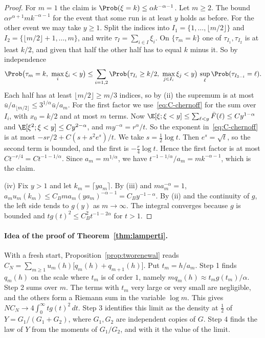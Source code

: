 \begin{proof}
For $m=1$ the claim is $\Prob(\xi=k)\le\alpha k^{-\alpha-1}$. Let $m\ge2$. The bound
$\alpha r^{\alpha+1}mk^{-\alpha-1}$ for the event that some run is at least $y$ holds as
before. For the other event we may take $y\ge1$. Split the indices into
$I_1=\{1,\dots,\lfloor m/2\rfloor\}$ and $I_2=\{\lfloor m/2\rfloor+1,\dots,m\}$, and
write $\tau_I=\sum_{i\in I}\xi_i$. On $\{\tau_m=k\}$ one of $\tau_{I_1},\tau_{I_2}$ is at
least $k/2$, and given that half the other half has to equal $k$ minus it. So by
independence
\[
\Prob\bigl(\tau_m=k,\ \max_i\xi_i<y\bigr)\le\sum_{i=1,2}
\Prob\bigl(\tau_{I_i}\ge k/2,\ \max_{j\in I_i}\xi_j<y\bigr)\,\sup_\ell\Prob(\tau_{I_{3-i}}=\ell).
\]
Each half has at least $\lfloor m/2\rfloor\ge m/3$ indices, so by (ii) the supremum is at
most $\bar u/a_{\lfloor m/2\rfloor}\le3^{1/\alpha}\bar u/a_m$. For the first factor we
use~\eqref{eq:C-chernoff} for the sum over $I_i$, with $x_0=k/2$ and at most $m$ terms.
Now $\E[\xi;\xi<y]\le\sum_{\ell<y}\bar F(\ell)\le Cy^{1-\alpha}$ and
$\E[\xi^2;\xi<y]\le Cy^{2-\alpha}$, and $my^{-\alpha}=r^\alpha/t$. So the exponent
in~\eqref{eq:C-chernoff} is at most $-sr/2+C(s+s^2e^s)/t$. We take $s=\frac12\log t$.
Then $e^s=\sqrt t$, so the second term is bounded, and the first is $-\frac r4\log t$.
Hence the first factor is at most $Ct^{-r/4}=Ct^{-1-1/\alpha}$. Since $a_m=m^{1/\alpha}$,
we have $t^{-1-1/\alpha}/a_m=mk^{-\alpha-1}$, which is the claim.

(iv) Fix $y>1$ and let $k_m=\lceil ya_m\rceil$. By (iii) and $ma_m^{-\alpha}=1$,
$a_mu_m(k_m)\le C_Bma_m(ya_m)^{-\alpha-1}=C_By^{-1-\alpha}$. By (ii) and the continuity
of $g$, the left side tends to $g(y)$ as $m\to\infty$. The integral converges because
$g$ is bounded and $tg(t)^2\le C_B^2t^{-1-2\alpha}$ for $t>1$.
\end{proof}

\paragraph{Idea of the proof of Theorem~\ref{thm:lamperti}.}
With a fresh start, Proposition~\ref{prop:tworenewal} reads
$C_N=\sum_{m\ge1}u_m(h)\bigl[q_m(h)+q_{m+1}(h)\bigr]$. Put $t_m=h/a_m$. Step 1 finds
$q_m(h)$ on the scale where $t_m$ is of order $1$, namely $mq_m(h)\approx t_mg(t_m)/\alpha$.
Step 2 sums over $m$. The terms with $t_m$ very large or very small are negligible, and
the others form a Riemann sum in the variable $\log m$. This gives
$NC_N\to4\int_0^\infty tg(t)^2\,dt$. Step 3 identifies this limit as the density at
$\frac12$ of $Y=G_1/(G_1+G_2)$, where $G_1,G_2$ are independent copies of $G$. Step 4
finds the law of $Y$ from the moments of $G_1/G_2$, and with it the value of the limit.

